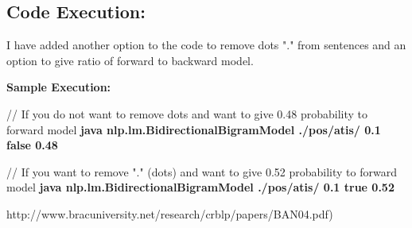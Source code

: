 \subsection{Code Execution:}

I have added another option to the code to remove dots "." from sentences and an option to give ratio of forward to backward model. 

{\bfseries Sample Execution:}

// If you do not want to remove dots and want to give 0.48 probability to forward model
\newline
{\bfseries java nlp.lm.BidirectionalBigramModel ./pos/atis/ 0.1 false 0.48}


// If you want to remove "." (dots) and want to give 0.52 probability to forward model
\newline
{\bfseries java nlp.lm.BidirectionalBigramModel ./pos/atis/ 0.1 true 0.52}

\begin{thebibliography}{100} %

 http://www.bracuniversity.net/research/crblp/papers/BAN04.pdf)

\end{thebibliography} 
